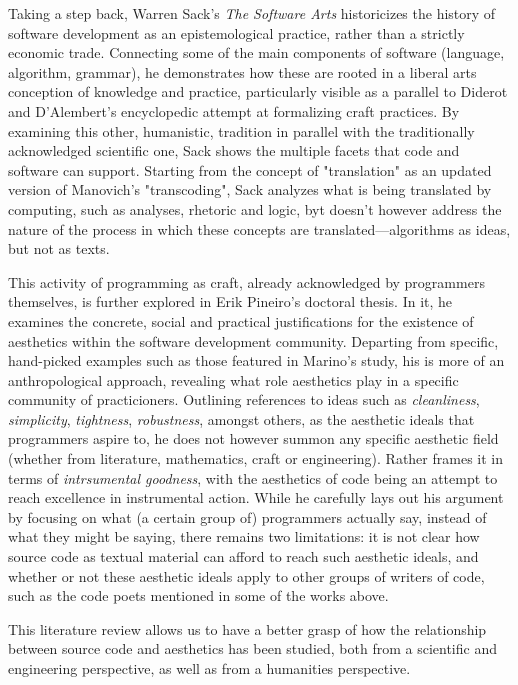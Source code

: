 Taking a step back, Warren Sack's \emph{The Software Arts}\cite{sack_software_2019} historicizes the history of software development as an epistemological practice, rather than a strictly economic trade. Connecting some of the main components of software (language, algorithm, grammar), he demonstrates how these are rooted in a liberal arts conception of knowledge and practice, particularly visible as a parallel to Diderot and D'Alembert's encyclopedic attempt at formalizing craft practices. By examining this other, humanistic, tradition in parallel with the traditionally acknowledged scientific one, Sack shows the multiple facets that code and software can support. Starting from the concept of "translation" as an updated version of Manovich's "transcoding", Sack analyzes what is being translated by computing, such as analyses, rhetoric and logic, byt doesn't however address the nature of the process in which these concepts are translated—algorithms as ideas, but not as texts.

This activity of programming as craft, already acknowledged by programmers themselves, is further explored in Erik Pineiro's doctoral thesis\cite{pineiro_aesthetics_2003}. In it, he examines the concrete, social and practical justifications for the existence of aesthetics within the software development community. Departing from specific, hand-picked examples such as those featured in Marino's study, his is more of an anthropological approach, revealing what role aesthetics play in a specific community of practicioners. Outlining references to ideas such as \emph{cleanliness}, \emph{simplicity}, \emph{tightness}, \emph{robustness}, amongst others, as the aesthetic ideals that programmers aspire to, he does not however summon any specific aesthetic field (whether from literature, mathematics, craft or engineering). Rather frames it in terms of \emph{intrsumental goodness}, with the aesthetics of code being an attempt to reach excellence in instrumental action. While he carefully lays out his argument by focusing on what (a certain group of) programmers actually say, instead of what they might be saying, there remains two limitations: it is not clear how source code as textual material can afford to reach such aesthetic ideals, and whether or not these aesthetic ideals apply to other groups of writers of code, such as the code poets mentioned in some of the works above.

\vspace*{1\baselineskip}

This literature review allows us to have a better grasp of how the relationship between source code and aesthetics has been studied, both from a scientific and engineering perspective, as well as from a humanities perspective.

